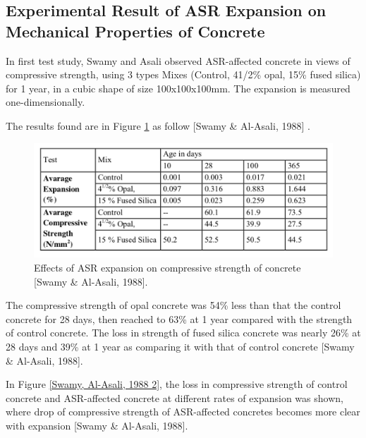 
\subsection{Experimental Result of ASR Expansion on Mechanical Properties of Concrete}

In first test study, Swamy and Asali\cite{Swamy} observed ASR-affected concrete in views of compressive strength, using 3 types Mixes (Control, 41/2\% opal, 15\% fused silica) for 1 year, in a cubic shape of size 100x100x100mm. The expansion is measured one-dimensionally.

The results found are in Figure \ref{Swamy1} as follow [Swamy \& Al-Asali, 1988] .

\begin{figure}[h!]
  \centering
  \includegraphics[width=0.8\linewidth]{Reference/temp3.png}
  \caption{Effects of ASR expansion on compressive strength of concrete [Swamy \& Al-Asali, 1988].}
  \label{Swamy1}
\end{figure}


The compressive strength of opal concrete was 54\% less than that the control concrete for 28 days, then reached to 63\% at 1 year compared with the strength of control concrete. The loss in strength of fused silica concrete was nearly 26\% at 28 days and 39\% at 1 year as comparing it with that of control concrete [Swamy \& Al-Asali, 1988].

In Figure \ref{Swamy, Al-Asali, 1988 2}, the loss in compressive strength of control concrete and ASR-affected concrete at different rates of expansion was shown, where drop of compressive strength of ASR-affected concretes becomes more clear with expansion [Swamy \& Al-Asali, 1988].

